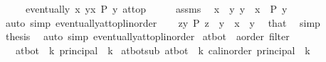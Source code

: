 \begin{isabellebody}
\ \ \ \ \ {\isachardoublequoteopen}eventually\ {\isacharparenleft}{\kern0pt}{\isasymlambda}x{\isachardot}{\kern0pt}\ {\isasymforall}y{\isasymge}x{\isachardot}{\kern0pt}\ P\ y{\isacharparenright}{\kern0pt}\ at{\isacharunderscore}{\kern0pt}top{\isachardoublequoteclose}\isanewline
%
\isadelimproof
%
\endisadelimproof
%
\isatagproof
{}\isamarkupfalse%
\ {\isacharminus}{\kern0pt}\isanewline
\ \ \isamarkupfalse%
\ assms\ \isamarkupfalse%
\ x\ \ {\isachardoublequoteopen}{\isasymAnd}y{\isachardot}{\kern0pt}\ y\ {\isasymge}\ x\ {\isasymLongrightarrow}\ P\ y{\isachardoublequoteclose}\ \isamarkupfalse%
\ {\isacharparenleft}{\kern0pt}auto\ simp{\isacharcolon}{\kern0pt}\ eventually{\isacharunderscore}{\kern0pt}at{\isacharunderscore}{\kern0pt}top{\isacharunderscore}{\kern0pt}linorder{\isacharparenright}{\kern0pt}\isanewline
\ \ \isamarkupfalse%
\ {\isachardoublequoteopen}{\isasymforall}z{\isasymge}y{\isachardot}{\kern0pt}\ P\ z{\isachardoublequoteclose}\ \ {\isachardoublequoteopen}y\ {\isasymge}\ x{\isachardoublequoteclose}\ \ y\ \isamarkupfalse%
\ that\ \isamarkupfalse%
\ simp\isanewline
\ \ \isamarkupfalse%
\ {\isacharquery}{\kern0pt}thesis\ \isamarkupfalse%
\ {\isacharparenleft}{\kern0pt}auto\ simp{\isacharcolon}{\kern0pt}\ eventually{\isacharunderscore}{\kern0pt}at{\isacharunderscore}{\kern0pt}top{\isacharunderscore}{\kern0pt}linorder{\isacharparenright}{\kern0pt}\isanewline
{}\isamarkupfalse%
%
\endisatagproof
{\isafoldproof}%
%
\isadelimproof
\isanewline
%
\endisadelimproof
\isanewline
{}\isamarkupfalse%
\ at{\isacharunderscore}{\kern0pt}bot\ {\isacharcolon}{\kern0pt}{\isacharcolon}{\kern0pt}\ {\isachardoublequoteopen}{\isacharparenleft}{\kern0pt}{\isacharprime}{\kern0pt}a{\isacharcolon}{\kern0pt}{\isacharcolon}{\kern0pt}order{\isacharparenright}{\kern0pt}\ filter{\isachardoublequoteclose}\isanewline
\ \ \ {\isachardoublequoteopen}at{\isacharunderscore}{\kern0pt}bot\ {\isacharequal}{\kern0pt}\ {\isacharparenleft}{\kern0pt}{\isasymSqinter}k{\isachardot}{\kern0pt}\ principal\ {\isacharbraceleft}{\kern0pt}{\isachardot}{\kern0pt}{\isachardot}{\kern0pt}\ k{\isacharbraceright}{\kern0pt}{\isacharparenright}{\kern0pt}{\isachardoublequoteclose}\isanewline
\isanewline
{}\isamarkupfalse%
\ at{\isacharunderscore}{\kern0pt}bot{\isacharunderscore}{\kern0pt}sub{\isacharcolon}{\kern0pt}\ {\isachardoublequoteopen}at{\isacharunderscore}{\kern0pt}bot\ {\isacharequal}{\kern0pt}\ {\isacharparenleft}{\kern0pt}{\isasymSqinter}k{\isasymin}{\isacharbraceleft}{\kern0pt}{\isachardot}{\kern0pt}{\isachardot}{\kern0pt}\ c{\isacharcolon}{\kern0pt}{\isacharcolon}{\kern0pt}{\isacharprime}{\kern0pt}a{\isacharcolon}{\kern0pt}{\isacharcolon}{\kern0pt}linorder{\isacharbraceright}{\kern0pt}{\isachardot}{\kern0pt}\ principal\ {\isacharbraceleft}{\kern0pt}{\isachardot}{\kern0pt}{\isachardot}{\kern0pt}\ k{\isacharbraceright}{\kern0pt}{\isacharparenright}{\kern0pt}{\isachardoublequoteclose}\isanewline

\end{isabellebody}
